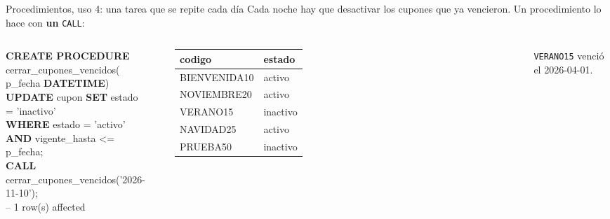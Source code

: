 \documentclass[aspectratio=169,10pt,c]{beamer}
\newcommand{\kw}[1]{\textcolor{utpRojo}{\textbf{#1}}}
\newcommand{\com}[1]{\textcolor{utpGrisMedio}{#1}}
\newcommand{\gris}[1]{\textcolor{utpGris}{#1}}
\newcommand{\dentro}[1]{{\setlength{\fboxsep}{1.5pt}\colorbox{yellow!45}{#1}}}
\newcommand{\fila}{\rowcolor{yellow!45}}
\newenvironment{sqlcode}[1][.86\textwidth]
  {\begin{center}\begin{lrbox}{\sqlbuf}\begin{minipage}{#1}\ttfamily\footnotesize\vspace{6pt}\raggedright}
  {\vspace{6pt}\end{minipage}\end{lrbox}\colorbox{utpGrisClaro}{\usebox{\sqlbuf}}\end{center}}
\newcommand{\col}{\dimexpr\textwidth-2\fboxsep\relax}
\newcommand{\ind}{\hspace*{1.2em}}
\newcommand{\cab}[1]{\normalfont\bfseries #1}
\newcommand{\res}[3]{%
  \centering{\scriptsize\color{utpGris}resultado}\\[3pt]
  \footnotesize\ttfamily
  \begin{tabular}{#1}
  \toprule
  #2 \\
  \midrule
  #3
  \bottomrule
  \end{tabular}}
\begin{document}
\begin{frame}{Procedimientos, uso 4: una tarea que se repite cada día}
\small Cada noche hay que desactivar los cupones que ya vencieron. Un procedimiento lo hace con \textbf{un} \texttt{CALL}:
\vspace{0.1cm}
\begin{columns}[c,onlytextwidth]
\begin{sqlcode}[\col]
\kw{CREATE PROCEDURE} cerrar\_cupones\_vencidos(\\
\ind p\_fecha \kw{DATETIME})\\
\kw{UPDATE} cupon \kw{SET} estado = 'inactivo'\\
\kw{WHERE} estado = 'activo'\\
\ind\kw{AND} vigente\_hasta <= p\_fecha;\\[6pt]
\dentro{\kw{CALL} cerrar\_cupones\_vencidos('2026-11-10');}\\
\com{-- 1 row(s) affected}
\end{sqlcode}
\res{ll}{\cab{codigo} & \cab{estado}}{BIENVENIDA10 & activo \\ NOVIEMBRE20 & activo \\ \fila VERANO15 & inactivo \\ NAVIDAD25 & activo \\ PRUEBA50 & inactivo \\}
\par\vspace{4pt}
{\centering\normalfont\scriptsize\gris{\texttt{VERANO15} venció el 2026-04-01.}\par}
\end{columns}
\vspace{0.3cm}
\end{frame}
\end{document}
